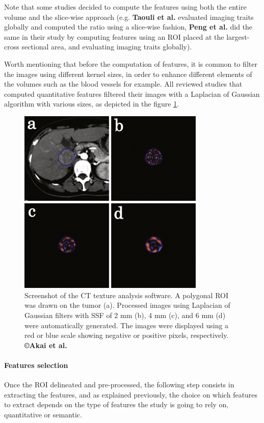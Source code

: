 \documentclass[]{article}
\let\oldparagraph\paragraph
\renewcommand{\paragraph}[1]{\oldparagraph{#1}\mbox{}}
\begin{document}
Note that some studies decided to compute the features using both the
entire volume and the slice-wise approach (e.g. \textbf{Taouli et al.}
evaluated imaging traits globally and computed the ratio using a
slice-wise fashion, \textbf{Peng et al.} did the same in their study by
computing features using an ROI placed at the largest-cross sectional
area, and evaluating imaging traits globally).

Worth mentioning that before the computation of features, it is common
to filter the images using different kernel sizes, in order to enhance
different elements of the volumes such as the blood vessels for example.
All reviewed studies that computed quantitative features filtered their
images with a Laplacian of Gaussian algorithm with various sizes, as
depicted in the figure \ref{AkaiFig_Roi}.

\begin{figure}[ht!]
\centering
\includegraphics[width=3.50110in,height=3.51334in]{./images/image15.png}
\caption{ Screenshot of the CT texture analysis software. A polygonal ROI was
drawn on the tumor (a). Processed images using Laplacian of Gaussian
filters with SSF of 2 mm (b), 4 mm (c), and 6 mm (d) were automatically
generated. The images were displayed using a red or blue scale showing
negative or positive pixels, respectively. \textbf{©Akai et al.}}
\label{AkaiFig_Roi}
\end{figure}

\paragraph{Features selection}\label{features-selection-1}

Once the ROI delineated and pre-processed, the following step consists
in extracting the features, and as explained previously, the choice on
which features to extract depends on the type of features the study is
going to rely on, quantitative or semantic.
\end{document}

